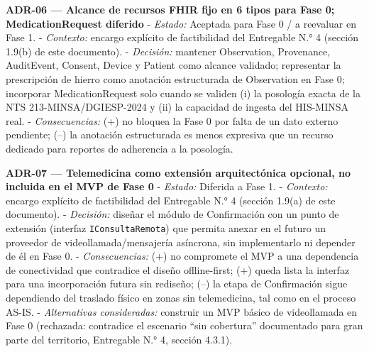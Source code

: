 \documentclass[11pt,a4paper]{article}
\begin{document}
\textbf{ADR-06 --- Alcance de recursos FHIR fijo en 6 tipos para Fase 0; MedicationRequest diferido}
- \emph{Estado:} Aceptada para Fase 0 / a reevaluar en Fase 1.
- \emph{Contexto:} encargo explícito de factibilidad del Entregable N.° 4 (sección 1.9(b) de este documento).
- \emph{Decisión:} mantener Observation, Provenance, AuditEvent, Consent, Device y Patient como alcance validado; representar la prescripción de hierro como anotación estructurada de Observation en Fase 0; incorporar MedicationRequest solo cuando se validen (i) la posología exacta de la NTS 213-MINSA/DGIESP-2024 y (ii) la capacidad de ingesta del HIS-MINSA real.
- \emph{Consecuencias:} (+) no bloquea la Fase 0 por falta de un dato externo pendiente; (--) la anotación estructurada es menos expresiva que un recurso dedicado para reportes de adherencia a la posología.

\textbf{ADR-07 --- Telemedicina como extensión arquitectónica opcional, no incluida en el MVP de Fase 0}
- \emph{Estado:} Diferida a Fase 1.
- \emph{Contexto:} encargo explícito de factibilidad del Entregable N.° 4 (sección 1.9(a) de este documento).
- \emph{Decisión:} diseñar el módulo de Confirmación con un punto de extensión (interfaz \texttt{IConsultaRemota}) que permita anexar en el futuro un proveedor de videollamada/mensajería asíncrona, sin implementarlo ni depender de él en Fase 0.
- \emph{Consecuencias:} (+) no compromete el MVP a una dependencia de conectividad que contradice el diseño offline-first; (+) queda lista la interfaz para una incorporación futura sin rediseño; (--) la etapa de Confirmación sigue dependiendo del traslado físico en zonas sin telemedicina, tal como en el proceso AS-IS.
- \emph{Alternativas consideradas:} construir un MVP básico de videollamada en Fase 0 (rechazada: contradice el escenario ``sin cobertura'' documentado para gran parte del territorio, Entregable N.° 4, sección 4.3.1).
\end{document}
